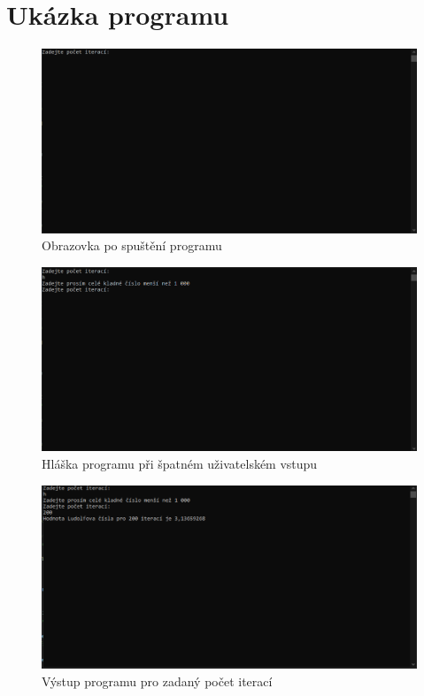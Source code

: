 \documentclass[11pt,a4paper,twoside,openright]{report}
\begin{document}
	\section{Ukázka programu}
	\begin{figure}[h!]
			\centering
			\includegraphics[width=1\hsize]{img/spusteni.png}
			\caption{Obrazovka po spuštění programu}
		\end{figure}
		
	\begin{figure}[h!]
			\centering
			\includegraphics[width=1\hsize]{img/spusteni_chybny_vstup.png}
			\caption{Hláška programu při špatném uživatelském vstupu}
		\end{figure}
		
	\begin{figure}[h!]
			\centering
			\includegraphics[width=1\hsize]{img/spusteni_vysledek.png}
			\caption{Výstup programu pro zadaný počet iterací}
		\end{figure}
	
\end{document}
